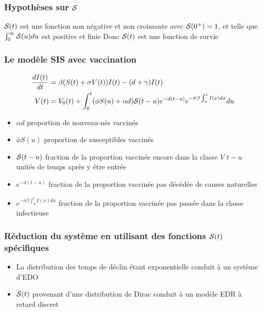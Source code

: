 \documentclass[aspectratio=169]{beamer}\usepackage[]{graphicx}\usepackage[]{xcolor}
\begin{document}
\begin{frame}\frametitle{Hypothèses sur $\S$}
$\S(t)$ est une fonction non négative et non croissante avec $\S(0^+)=1$, et telle que $\int_0^\infty \S(u)du$ est positive et finie
\vfill
Donc $\S(t)$ est une fonction de survie
\end{frame}

\begin{frame}\frametitle{Le modèle SIS avec vaccination}
\begin{subequations}\label{sys:SIVS_general}
\begin{align}
  \frac{dI(t)}{dt}&= \beta(S(t)+\sigma V(t))I(t)-(d+\gamma)I(t)
  \label{sys:SIVS_general_I}\\
  V(t)&= V_0(t)
  +\int_0^t(\phi S(u)+\alpha d)\S(t-u)e^{-d(t-u)}
  e^{-\sigma\beta\int_u^tI(x)dx}du \label{sys:SIVS_general_V}
\end{align}
\end{subequations}
\vfill
\begin{itemize}
\item $\alpha d$ proportion de nouveau-nés vaccinés
\item $\phi S(u)$ proportion de susceptibles vaccinés
\item $\S(t-u)$ fraction de la proportion vaccinée encore dans la classe $V$
  $t-u$ unités de temps après y être entrée
\item $e^{-d(t-u)}$ fraction de la proportion vaccinée
pas décédée de causes naturelles
\item $e^{-\sigma\beta\int_u^t I(x)dx}$ fraction de la proportion
  vaccinée pas passée dans la classe infectieuse
\end{itemize}
\end{frame}

\begin{frame}\frametitle{Réduction du système en utilisant des fonctions $\S(t)$ spécifiques}
\vfill
\begin{itemize}
\item La distribution des temps de déclin étant exponentielle conduit à
 un système d'EDO
\vfill
\item $\S(t)$ provenant d'une distribution de Dirac conduit à un modèle EDR à retard discret
\end{itemize}
\end{frame}
\end{document}
